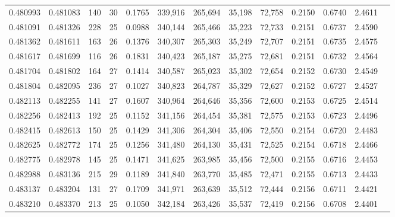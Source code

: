 \begin{tabular}{rrrrrrrrrrrrr}
0.480993 & 0.481083 &   140 &  30 &                                     0.1765 & 339,916 & 265,694 &  35,198 &  72,758 & 0.2150 & 0.6740 & 2.4611 \\
0.481091 & 0.481326 &   228 &  25 &                                     0.0988 & 340,144 & 265,466 &  35,223 &  72,733 & 0.2151 & 0.6737 & 2.4590 \\
0.481362 & 0.481611 &   163 &  26 &                                     0.1376 & 340,307 & 265,303 &  35,249 &  72,707 & 0.2151 & 0.6735 & 2.4575 \\
0.481617 & 0.481699 &   116 &  26 &                                     0.1831 & 340,423 & 265,187 &  35,275 &  72,681 & 0.2151 & 0.6732 & 2.4564 \\
0.481704 & 0.481802 &   164 &  27 &                                     0.1414 & 340,587 & 265,023 &  35,302 &  72,654 & 0.2152 & 0.6730 & 2.4549 \\
0.481804 & 0.482095 &   236 &  27 &                                     0.1027 & 340,823 & 264,787 &  35,329 &  72,627 & 0.2152 & 0.6727 & 2.4527 \\
0.482113 & 0.482255 &   141 &  27 &                                     0.1607 & 340,964 & 264,646 &  35,356 &  72,600 & 0.2153 & 0.6725 & 2.4514 \\
0.482256 & 0.482413 &   192 &  25 &                                     0.1152 & 341,156 & 264,454 &  35,381 &  72,575 & 0.2153 & 0.6723 & 2.4496 \\
0.482415 & 0.482613 &   150 &  25 &                                     0.1429 & 341,306 & 264,304 &  35,406 &  72,550 & 0.2154 & 0.6720 & 2.4483 \\
0.482625 & 0.482772 &   174 &  25 &                                     0.1256 & 341,480 & 264,130 &  35,431 &  72,525 & 0.2154 & 0.6718 & 2.4466 \\
0.482775 & 0.482978 &   145 &  25 &                                     0.1471 & 341,625 & 263,985 &  35,456 &  72,500 & 0.2155 & 0.6716 & 2.4453 \\
0.482988 & 0.483136 &   215 &  29 &                                     0.1189 & 341,840 & 263,770 &  35,485 &  72,471 & 0.2155 & 0.6713 & 2.4433 \\
0.483137 & 0.483204 &   131 &  27 &                                     0.1709 & 341,971 & 263,639 &  35,512 &  72,444 & 0.2156 & 0.6711 & 2.4421 \\
0.483210 & 0.483370 &   213 &  25 &                                     0.1050 & 342,184 & 263,426 &  35,537 &  72,419 & 0.2156 & 0.6708 & 2.4401 \\

\end{tabular}
